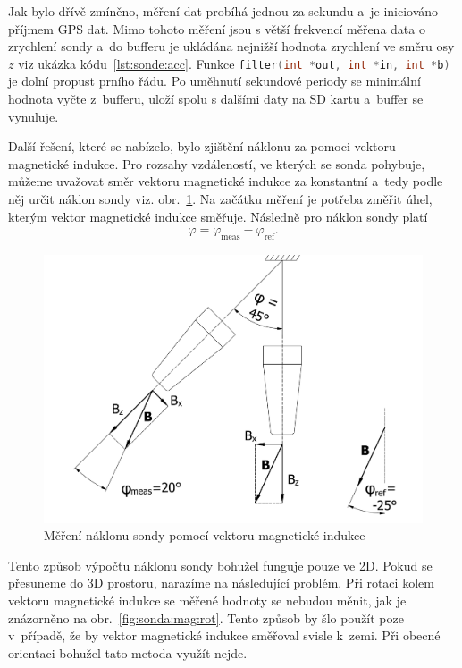 \documentclass[twoside]{ctuthesis}
\theoremstyle{plain}
\theoremstyle{definition}
\theoremstyle{note}
\begin{document}
		Jak bylo dřívě zmíněno, měření dat probíhá jednou za sekundu a~je iniciováno příjmem GPS dat. Mimo tohoto měření jsou s větší frekvencí měřena data o zrychlení sondy a~do bufferu je ukládána nejnižší hodnota zrychlení ve směru osy $z$ viz ukázka kódu~\ref{lst:sonde:acc}. Funkce \lstinline[language=C]|filter(int *out, int *in, int *b)| je dolní propust prního řádu. Po uměhnutí sekundové periody se minimální hodnota vyčte z~bufferu, uloží spolu s dalšími daty na SD kartu a~buffer se vynuluje.
			


		Další řešení, které se nabízelo, bylo zjištění náklonu za pomoci vektoru magnetické indukce. Pro rozsahy vzdáleností, ve kterých se sonda pohybuje, můžeme uvažovat směr vektoru magnetické indukce za konstantní a~tedy podle něj určit náklon sondy viz. obr.~\ref{fig:sonda:mag}. Na začátku měření je potřeba změřit úhel, kterým vektor magnetické indukce směřuje. Následně pro náklon sondy platí
		\begin{align}
			\varphi = \varphi_\text{meas} - \varphi_\text{ref}.
		\end{align}

		\begin{figure}[hbtp]
			\centering
			\includegraphics[width=.5\textwidth]{Figures/sonda_naklon_mag.pdf}
			\caption{Měření náklonu sondy pomocí vektoru magnetické indukce}
			\label{fig:sonda:mag}
		\end{figure}

		Tento způsob výpočtu náklonu sondy bohužel funguje pouze ve 2D. Pokud se přesuneme do 3D prostoru, narazíme na následující problém. Při rotaci kolem vektoru magnetické indukce se měřené hodnoty se nebudou měnit, jak je znázorněno na obr.~\ref{fig:sonda:mag:rot}. Tento způsob by šlo použít poze v~případě, že by vektor magnetické indukce směřoval svisle k~zemi. Při obecné orientaci bohužel tato metoda využít nejde.
\end{document}
